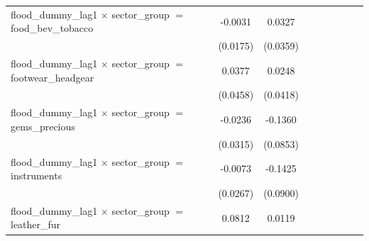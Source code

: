 \begin{tabular}{lcccccccc}
   flood\_dummy\_lag1 $\times$ sector\_group $=$ food\_bev\_tobacco               & -0.0031               & 0.0327                &                       &                       &                       &                       &                       &   \\   
                                                                                  & (0.0175)              & (0.0359)              &                       &                       &                       &                       &                       &   \\   
   flood\_dummy\_lag1 $\times$ sector\_group $=$ footwear\_headgear               & 0.0377                & 0.0248                &                       &                       &                       &                       &                       &   \\   
                                                                                  & (0.0458)              & (0.0418)              &                       &                       &                       &                       &                       &   \\   
   flood\_dummy\_lag1 $\times$ sector\_group $=$ gems\_precious                   & -0.0236               & -0.1360               &                       &                       &                       &                       &                       &   \\   
                                                                                  & (0.0315)              & (0.0853)              &                       &                       &                       &                       &                       &   \\   
   flood\_dummy\_lag1 $\times$ sector\_group $=$ instruments                      & -0.0073               & -0.1425               &                       &                       &                       &                       &                       &   \\   
                                                                                  & (0.0267)              & (0.0900)              &                       &                       &                       &                       &                       &   \\   
   flood\_dummy\_lag1 $\times$ sector\_group $=$ leather\_fur                     & 0.0812                & 0.0119                &                       &                       &                       &                       &                       &   \\   

\end{tabular}
